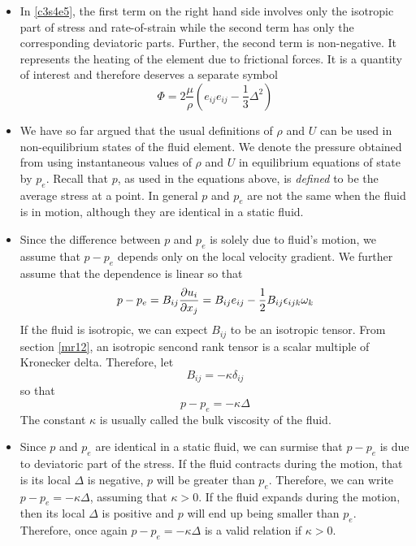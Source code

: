 \begin{itemize}
\item In \eqref{c3s4e5}, the first term on the right hand side involves only the isotropic part of stress and rate-of-strain while the second term has only the corresponding 
deviatoric parts. Further, the second term is non-negative. It represents the heating of the element due to frictional forces. It is a quantity of interest and therefore deserves
a separate symbol
\begin{equation}\label{c3s4e6}
\Phi = 2\frac{\mu}{\rho}\left(e_{ij}e_{ij} -\frac{1}{3}\Delta^2\right)
\end{equation}

\item We have so far argued that the usual definitions of $\rho$ and $U$ can be used in non-equilibrium states of the fluid element. We denote the pressure obtained from using 
instantaneous values of $\rho$ and $U$ in equilibrium equations of state by $p_e$. Recall that $p$, as used in the equations above, is \emph{defined} to be the average stress at a 
point. In general $p$ and $p_e$ are not the same when the fluid is in motion, although they are identical in a static fluid.

\item Since the difference between $p$ and $p_e$ is solely due to fluid's motion, we assume that $p - p_e$ depends only on the local velocity gradient. We further assume that the
dependence is linear so that 
\[
p - p_e = B_{ij}\frac{\partial{u_i}}{\partial{x_j}} = B_{ij}e_{ij} - \frac{1}{2}B_{ij}\epsilon_{ijk}\omega_k
\]
If the fluid is isotropic, we can expect $B_{ij}$ to be an isotropic tensor. From section \ref{mr12}, an isotropic sencond rank tensor is a scalar multiple of Kronecker delta. Therefore,
let
\begin{equation}\label{c3s4e7}
B_{ij} = -\kappa\delta_{ij}
\end{equation}
so that
\begin{equation}\label{c3s4e8}
p - p_e = -\kappa\Delta
\end{equation}
The constant $\kappa$ is usually called the bulk viscosity of the fluid.

\item Since $p$ and $p_e$ are identical in a static fluid, we can surmise that $p - p_e$ is due to deviatoric part of the stress. If the fluid contracts during the motion, that is its 
local $\Delta$ is negative, $p$ will be greater than $p_e$. Therefore, we can write $p - p_e = -\kappa\Delta$, assuming that $\kappa > 0$. If the fluid expands during the motion, then
its local $\Delta$ is positive and $p$ will end up being smaller than $p_e$. Therefore, once again $p - p_e = -\kappa\Delta$ is a valid relation if $\kappa > 0$. 


\end{itemize}
